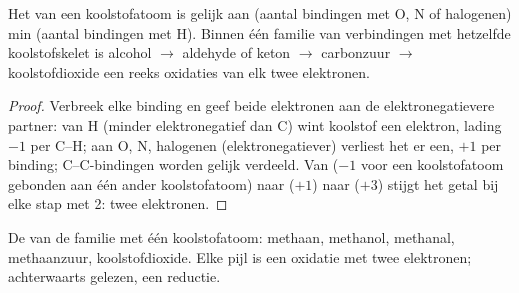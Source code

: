 \begin{proposition}\label{prop:b1:organic-redox:on-of-carbon}
Het  van een koolstofatoom is gelijk aan (aantal bindingen
met O, N of halogenen) min (aantal bindingen met H). Binnen één familie
van verbindingen met hetzelfde koolstofskelet is alcohol $\to$ aldehyde of
keton $\to$ carbonzuur $\to$ koolstofdioxide een reeks oxidaties van elk
twee elektronen.
\end{proposition}

\begin{proof}
Verbreek elke binding en geef beide elektronen aan de elektronegatievere
partner: van H (minder elektronegatief dan C) wint koolstof een elektron,
lading $-1$ per C--H; aan O, N, halogenen (elektronegatiever) verliest
het er een, $+1$ per binding; C--C-bindingen worden gelijk verdeeld. Van
 ($-1$ voor een koolstofatoom gebonden aan één ander
koolstofatoom) naar  ($+1$) naar  ($+3$) stijgt het
getal bij elke stap met 2: twee elektronen.
\end{proof}

\begin{omfigure}

{\small De  van de familie met één koolstofatoom: methaan,
methanol, methanal, methaanzuur, koolstofdioxide. Elke pijl is een
oxidatie met twee elektronen; achterwaarts gelezen, een reductie.}
\end{omfigure}

